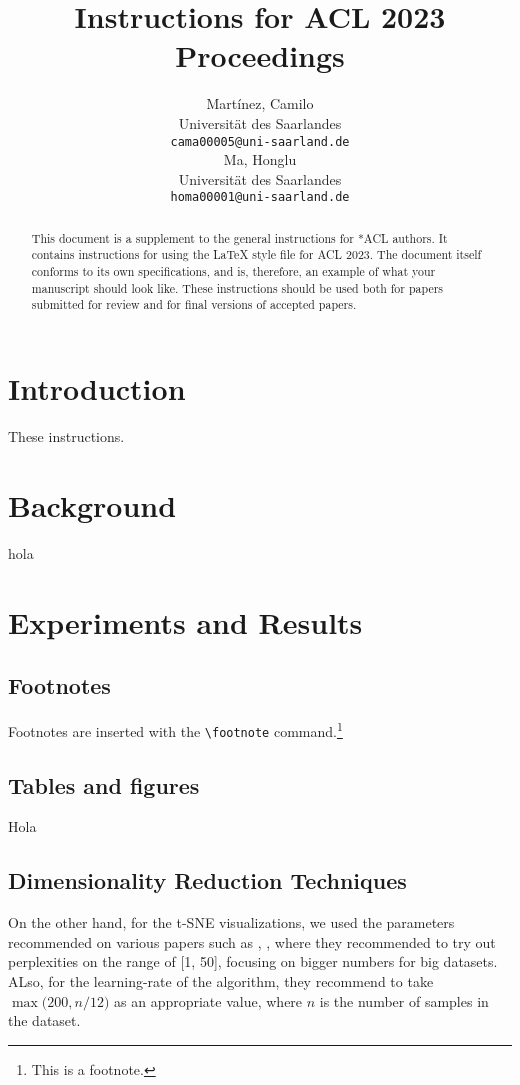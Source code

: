 \documentclass[11pt]{article}
\title{Instructions for ACL 2023 Proceedings}
\author{Martínez, Camilo \\
  Universität des Saarlandes \\
  \texttt{cama00005@uni-saarland.de} \\\And
  Ma, Honglu \\
  Universität des Saarlandes \\
  \texttt{homa00001@uni-saarland.de} \\}
\begin{document}
\maketitle
\begin{abstract}
    This document is a supplement to the general instructions for *ACL authors. It contains instructions for using the \LaTeX{} style file for ACL 2023.
    The document itself conforms to its own specifications, and is, therefore, an example of what your manuscript should look like.
    These instructions should be used both for papers submitted for review and for final versions of accepted papers.
\end{abstract}

\section{Introduction}

These instructions.

\section{Background}

hola

\section{Experiments and Results}

\subsection{Footnotes}

Footnotes are inserted with the \verb|\footnote| command.\footnote{This is a footnote.}

\subsection{Tables and figures}

Hola

\subsection{Dimensionality Reduction Techniques}

On the other hand, for the t-SNE visualizations, we used the parameters recommended on various papers such as \cite{GOVE202287}, \cite{Weber2023}, where they recommended to try out perplexities on the range of [1, 50], focusing on bigger numbers for big datasets. ALso, for the learning-rate of the algorithm, they recommend to take $\max{(200, n / 12})$ as an appropriate value, where $n$ is the number of samples in the dataset.
\end{document}
